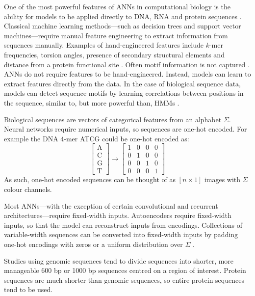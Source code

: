 One of the most powerful features of ANNs in computational biology is the ability for models to be applied directly to DNA, RNA and protein sequences \cite{Angermueller2016}. Classical machine learning methods---such as decision trees and support vector machines---require manual feature engineering to extract information from sequences manually. Examples of hand-engineered features include $k$-mer frequencies, torsion angles, presence of secondary structural elements and distance from a protein functional site \cite{Das2020}. Often motif information is not captured \cite{Zhang2020}. ANNs do not require features to be hand-engineered. Instead, models can learn to extract features directly from the data. In the case of biological sequence data, models can detect sequence motifs by learning correlations between positions in the sequence, similar to, but more powerful than, HMMs \cite{Zhang2020,Seo2018}.

Biological sequences are vectors of categorical features from an alphabet $\Sigma$. Neural networks require numerical inputs, so sequences are one-hot encoded. For example the DNA $4$-mer ATCG could be one-hot encoded as:
\[
\begin{bmatrix}
    \text{A} \\
    \text{C} \\
    \text{G} \\
    \text{T}
\end{bmatrix}
\rightarrow
\begin{bmatrix}
    1 & 0 & 0 & 0 \\
    0 & 1 & 0 & 0 \\
    0 & 0 & 1 & 0 \\
    0 & 0 & 0 & 1
\end{bmatrix}
\]
As such, one-hot encoded sequences can be thought of as $[n\times 1]$ images with $\Sigma$ colour channels.

Most ANNs---with the exception of certain convolutional and recurrent architectures---require fixed-width inputs. Autoencoders require fixed-width inputs, so that the model can reconstruct inputs from encodings. Collections of variable-width sequences can be converted into fixed-width inputs by padding one-hot encodings with zeros \cite{Seo2018} or a uniform distribution over $\Sigma$ \cite{Alipanahi2015}.

Studies using genomic sequences tend to divide sequences into shorter, more manageable $600$ bp \cite{Kelley2016} or \num{1000} bp sequences \cite{Quang2016,Zhou2015,Angermueller2017} centred on a region of interest. Protein sequences are much shorter than genomic sequences, so entire protein sequences tend to be used.

